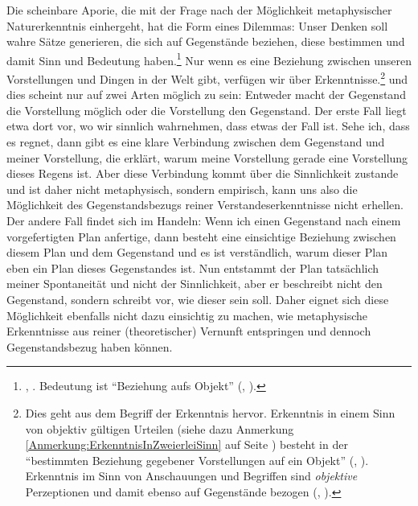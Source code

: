 \begin{nummerierung}
Die scheinbare Aporie, die mit der Frage nach der Möglichkeit metaphysischer
Naturerkenntnis einhergeht, hat die Form eines Dilemmas:
Unser Denken soll wahre Sätze generieren, die sich auf Gegenstände beziehen,
diese bestimmen und damit Sinn und Bedeutung
haben.\footnote{\cite[Vgl.][B 299]{Kant:KritikderreinenVernunft2003},
\cite[][III: 204.37--205.3]{Kant:GesammelteWerke1900ff.}. Bedeutung ist
\enquote{Beziehung aufs Objekt} \mkbibparens{\cite[][B 300]{Kant:KritikderreinenVernunft2003},
\cite[][III: 205.20--21]{Kant:GesammelteWerke1900ff.}}.} Nur wenn es eine
Beziehung zwischen unseren Vorstellungen und Dingen in der Welt gibt, verfügen
wir über Erkenntnisse.\footnote{Dies geht aus dem Begriff der Erkenntnis hervor.
Erkenntnis in einem  Sinn von objektiv gültigen
Urteilen (siehe dazu Anmerkung \ref{Anmerkung:ErkenntnisInZweierleiSinn} auf
Seite \pageref{Anmerkung:ErkenntnisInZweierleiSinn}) besteht in der
\enquote{bestimmten Beziehung gegebener Vorstellungen auf ein Objekt}
\mkbibparens{\cite[][B 137]{Kant:KritikderreinenVernunft2003},
\cite[][III: 111.17--18]{Kant:GesammelteWerke1900ff.}}. Erkenntnis im
 Sinn von Anschauungen und Begriffen sind
\emph{objektive} Perzeptionen und damit ebenso auf Gegenstände bezogen
\mkbibparens{\cite[siehe][B 376]{Kant:KritikderreinenVernunft2003},
\cite[][III: 250.3]{Kant:GesammelteWerke1900ff.}}.} und dies scheint nur auf
zwei Arten möglich zu sein: Entweder macht der Gegenstand die Vorstellung
möglich oder die Vorstellung den Gegenstand. Der erste Fall liegt etwa dort vor,
wo wir sinnlich wahrnehmen, dass etwas der Fall ist. Sehe ich, dass es regnet,
dann gibt es eine klare Verbindung zwischen dem Gegenstand und meiner
Vorstellung, die erklärt, warum meine Vorstellung gerade eine Vorstellung dieses
Regens ist. Aber diese Verbindung kommt über die Sinnlichkeit zustande und ist
daher nicht metaphysisch, sondern empirisch, kann uns also die Möglichkeit des
Gegenstandsbezugs reiner Verstandeserkenntnisse nicht erhellen.
Der andere Fall findet sich im Handeln: Wenn ich einen Gegenstand nach einem
vorgefertigten Plan anfertige, dann besteht eine einsichtige Beziehung zwischen
diesem Plan und dem Gegenstand und es ist verständlich, warum dieser Plan eben
ein Plan dieses Gegenstandes ist. Nun entstammt der Plan tatsächlich meiner
Spontaneität und nicht der Sinnlichkeit, aber er beschreibt nicht den
Gegenstand, sondern schreibt vor, wie dieser sein soll. Daher eignet sich diese
Möglichkeit ebenfalls nicht dazu einsichtig zu machen, wie metaphysische
Erkenntnisse aus reiner (theoretischer) Vernunft entspringen und dennoch
Gegenstandsbezug haben können.


\end{nummerierung}

